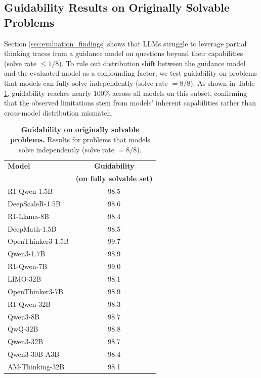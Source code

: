 \documentclass{article} %
\begin{document}
\subsection{Guidability Results on Originally Solvable Problems}
Section \ref{sec:evaluation_findings} shows that LLMs struggle to leverage partial thinking traces from a guidance model on questions beyond their capabilities (solve rate $\leq 1/8$). To rule out distribution shift between the guidance model and the evaluated model as a confounding factor, we test guidability on problems that models can fully solve independently (solve rate $= 8/8$). As shown in Table \ref{tab:ablation_recoverability_fully_solveable}, guidability reaches nearly $100\%$ across all models on this subset, confirming that the observed limitations stem from models' inherent capabilities rather than cross-model distribution mismatch.

\begin{table}[H]
  \centering
  \begin{tabular}{l|c}
    \toprule
    \multirow{1}{*}{\textbf{Model}} & \multicolumn{1}{c}{\textbf{Guidability}} \\
                                    & \textbf{(on fully solvable set)}\\
    \midrule
    R1-Qwen-1.5B    & 98.5 \\
    DeepScaleR-1.5B         & 98.6 \\
    R1-Llama-8B             & 98.4 \\
    DeepMath-1.5B           & 98.5 \\
    OpenThinker3-1.5B       & 99.7 \\
    Qwen3-1.7B              & 98.9 \\
    \midrule
    R1-Qwen-7B      & 99.0 \\
    LIMO-32B                & 98.1 \\
    OpenThinker3-7B         & 98.9 \\
    R1-Qwen-32B     & 98.3 \\
    \midrule
    Qwen3-8B                & 98.7 \\
    QwQ-32B                 & 98.8 \\
    Qwen3-32B               & 98.7 \\
    Qwen3-30B-A3B           & 98.4 \\
    AM-Thinking-32B         & 98.1 \\
    \bottomrule
  \end{tabular}
  \caption{\textbf{Guidability on originally solvable problems.} Results for problems that models solve independently (solve rate $= 8/8$).}
  \label{tab:ablation_recoverability_fully_solveable}
\end{table}
\end{document}
